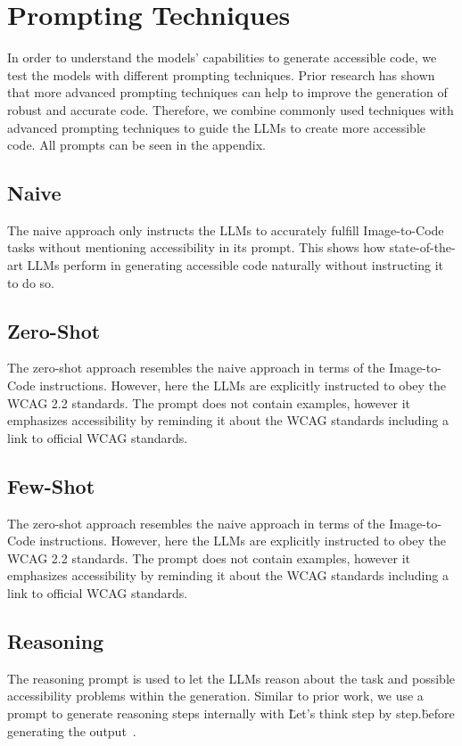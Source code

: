 \section{Prompting Techniques}
In order to understand the models' capabilities to generate accessible code, we test
the models with different prompting techniques. Prior research has shown that more 
advanced prompting techniques can help to improve the generation of robust and 
accurate code. Therefore, we combine commonly used techniques with 
advanced prompting techniques to guide the LLMs to create more accessible code.
All prompts can be seen in the appendix.

\subsection{Naive}
The naive approach only instructs the LLMs to accurately fulfill Image-to-Code tasks
without mentioning accessibility in its prompt. This shows how state-of-the-art 
LLMs perform in generating accessible code naturally without instructing it to 
do so.

\subsection{Zero-Shot}
The zero-shot approach resembles the naive approach in terms of the Image-to-Code
instructions. However, here the LLMs are explicitly instructed to obey the WCAG 
2.2 standards. The prompt does not contain examples, however it emphasizes 
accessibility by reminding it about the WCAG standards including a link to 
official WCAG standards.

\subsection{Few-Shot}
The zero-shot approach resembles the naive approach in terms of the Image-to-Code
instructions. However, here the LLMs are explicitly instructed to obey the WCAG 
2.2 standards. The prompt does not contain examples, however it emphasizes 
accessibility by reminding it about the WCAG standards including a link to 
official WCAG standards.

\subsection{Reasoning}
The reasoning prompt is used to let the LLMs reason about the task and possible 
accessibility problems within the generation. Similar to prior work, we use 
a prompt to generate reasoning steps internally with \"Let’s think step by 
step.\" before generating the output~\parencite{chae2024thinkexecute}.

